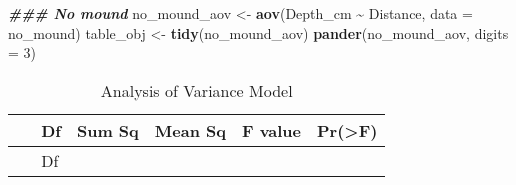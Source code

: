 \documentclass[
]{article}
\newenvironment{Shaded}{\begin{snugshade}}{\end{snugshade}}
\newcommand{\AttributeTok}[1]{\textcolor[rgb]{0.13,0.29,0.53}{#1}}
\newcommand{\DecValTok}[1]{\textcolor[rgb]{0.00,0.00,0.81}{#1}}
\newcommand{\DocumentationTok}[1]{\textcolor[rgb]{0.56,0.35,0.01}{\textbf{\textit{#1}}}}
\newcommand{\FunctionTok}[1]{\textcolor[rgb]{0.13,0.29,0.53}{\textbf{#1}}}
\newcommand{\NormalTok}[1]{#1}
\newcommand{\OtherTok}[1]{\textcolor[rgb]{0.56,0.35,0.01}{#1}}
\newcommand{\SpecialCharTok}[1]{\textcolor[rgb]{0.81,0.36,0.00}{\textbf{#1}}}
\begin{document}
\begin{Shaded}
\begin{Highlighting}[]
\DocumentationTok{\#\#\# No mound}
\NormalTok{no\_mound\_aov }\OtherTok{\textless{}{-}} \FunctionTok{aov}\NormalTok{(Depth\_cm }\SpecialCharTok{\textasciitilde{}}\NormalTok{ Distance, }\AttributeTok{data =}\NormalTok{ no\_mound)}
\NormalTok{table\_obj }\OtherTok{\textless{}{-}} \FunctionTok{tidy}\NormalTok{(no\_mound\_aov)}
\FunctionTok{pander}\NormalTok{(no\_mound\_aov, }\AttributeTok{digits =} \DecValTok{3}\NormalTok{)}
\end{Highlighting}
\end{Shaded}

\begin{longtable}[]{@{}
  >{\centering\arraybackslash}p{}
  >{\centering\arraybackslash}p{}
  >{\centering\arraybackslash}p{}
  >{\centering\arraybackslash}p{}
  >{\centering\arraybackslash}p{}
  >{\centering\arraybackslash}p{}@{}}
\caption{Analysis of Variance Model}\tabularnewline
\toprule\noalign{}
\begin{minipage}[b]{\linewidth}\centering
~
\end{minipage} & \begin{minipage}[b]{\linewidth}\centering
Df
\end{minipage} & \begin{minipage}[b]{\linewidth}\centering
Sum Sq
\end{minipage} & \begin{minipage}[b]{\linewidth}\centering
Mean Sq
\end{minipage} & \begin{minipage}[b]{\linewidth}\centering
F value
\end{minipage} & \begin{minipage}[b]{\linewidth}\centering
Pr(\textgreater F)
\end{minipage} \\
\midrule\noalign{}
\endfirsthead
\toprule\noalign{}
\begin{minipage}[b]{\linewidth}\centering
~
\end{minipage} & \begin{minipage}[b]{\linewidth}\centering
Df
\end{minipage} & \begin{minipage}[b]{\linewidth}\centering

\end{minipage}
\end{longtable}
\end{document}
